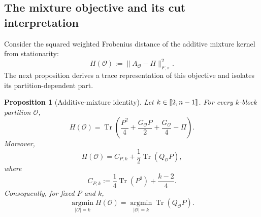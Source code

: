 \documentclass[11pt]{article}
\newtheorem{proposition}[theorem]{Proposition}
\newcommand{\1}{\mathbf{1}}
\providecommand{\llbracket}{\mathopen{[\mkern-2.7mu[}}
\providecommand{\rrbracket}{\mathclose{]\mkern-2.7mu]}}
\begin{document}
\subsection{The mixture objective and its cut interpretation}

Consider the squared weighted Frobenius distance of the additive
mixture kernel from stationarity:
\begin{equation}
	H(\mathcal O)
	:=\|A_{\mathcal O}-\Pi\|_{F,\pi}^2.
	\label{eq:H-definition}
\end{equation}
The next proposition derives a trace representation of this objective
and isolates its partition-dependent part.

\begin{proposition}[Additive-mixture identity]
	\label{prop:additive-mixture-identity}
	Let $k\in\llbracket 2,n-1\rrbracket$.
	For every $k$-block partition $\mathcal O$,
	\begin{equation}
		H(\mathcal O)
		=\operatorname{Tr}\left(
		\frac{P^2}{4}
		+\frac{G_{\mathcal O}P}{2}
		+\frac{G_{\mathcal O}}{4}
		-\Pi
		\right).
		\label{eq:H-trace}
	\end{equation}
	Moreover,
	\begin{equation}
		H(\mathcal O)
		=C_{P,k}
		+\frac12\operatorname{Tr}(Q_{\mathcal O}P),
		\label{eq:H-reduction}
	\end{equation}
	where
	\begin{equation}
		C_{P,k}
		:=\frac14\operatorname{Tr}(P^2)+\frac{k-2}{4}.
		\label{eq:H-constant}
	\end{equation}
	Consequently, for fixed $P$ and $k$,
	\begin{equation*}
		\operatorname*{argmin}_{|\mathcal O|=k}H(\mathcal O)
		=
		\operatorname*{argmin}_{|\mathcal O|=k}
		\operatorname{Tr}(Q_{\mathcal O}P).
	\end{equation*}
\end{proposition}
\end{document}
